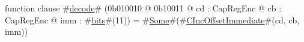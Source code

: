 function clause #\hyperref[sailMIPSzdecode]{decode}# (0b010010 @ 0b10011 @ cd : CapRegEnc @ cb : CapRegEnc @ imm : #\hyperref[sailMIPSzbits]{bits}#(11)) = #\hyperref[sailMIPSzSome]{Some}#(#\hyperref[sailMIPSzCIncOffsetImmediate]{CIncOffsetImmediate}#(cd, cb, imm))

